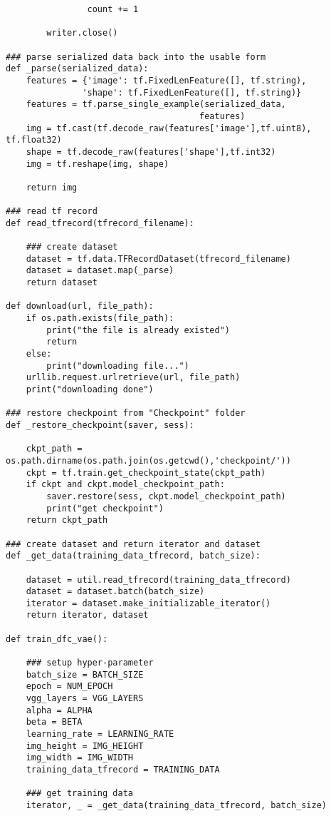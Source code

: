 \begin{footnotesize}
\begin{lstlisting}
                count += 1
        
        writer.close()
            
### parse serialized data back into the usable form
def _parse(serialized_data):
    features = {'image': tf.FixedLenFeature([], tf.string),
               'shape': tf.FixedLenFeature([], tf.string)}
    features = tf.parse_single_example(serialized_data,
                                      features)
    img = tf.cast(tf.decode_raw(features['image'],tf.uint8), tf.float32)
    shape = tf.decode_raw(features['shape'],tf.int32)
    img = tf.reshape(img, shape)
    
    return img

### read tf record
def read_tfrecord(tfrecord_filename):
    
    ### create dataset
    dataset = tf.data.TFRecordDataset(tfrecord_filename)
    dataset = dataset.map(_parse)
    return dataset

def download(url, file_path):
    if os.path.exists(file_path):
        print("the file is already existed")
        return
    else:
        print("downloading file...")
    urllib.request.urlretrieve(url, file_path) 
    print("downloading done")
    
### restore checkpoint from "Checkpoint" folder
def _restore_checkpoint(saver, sess):
    
    ckpt_path = os.path.dirname(os.path.join(os.getcwd(),'checkpoint/'))
    ckpt = tf.train.get_checkpoint_state(ckpt_path)
    if ckpt and ckpt.model_checkpoint_path:
        saver.restore(sess, ckpt.model_checkpoint_path)
        print("get checkpoint")
    return ckpt_path

### create dataset and return iterator and dataset
def _get_data(training_data_tfrecord, batch_size):
    
    dataset = util.read_tfrecord(training_data_tfrecord)
    dataset = dataset.batch(batch_size)
    iterator = dataset.make_initializable_iterator()
    return iterator, dataset
    
def train_dfc_vae():
    
    ### setup hyper-parameter
    batch_size = BATCH_SIZE
    epoch = NUM_EPOCH
    vgg_layers = VGG_LAYERS
    alpha = ALPHA
    beta = BETA
    learning_rate = LEARNING_RATE
    img_height = IMG_HEIGHT
    img_width = IMG_WIDTH
    training_data_tfrecord = TRAINING_DATA
    
    ### get training data 
    iterator, _ = _get_data(training_data_tfrecord, batch_size)


\end{lstlisting}
\end{footnotesize}
